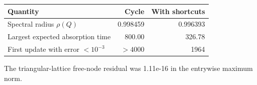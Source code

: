 \begin{center}\begin{tabular}{lrr}\toprule
Quantity & Cycle & With shortcuts\\\midrule
Spectral radius $\rho(Q)$ & 0.998459 & 0.996393\\
Largest expected absorption time & 800.00 & 326.78\\
First update with error $<10^{-3}$ & $>4000$ & 1964\\\bottomrule
\end{tabular}\end{center}
The triangular-lattice free-node residual was 1.11e-16 in the entrywise maximum norm.
